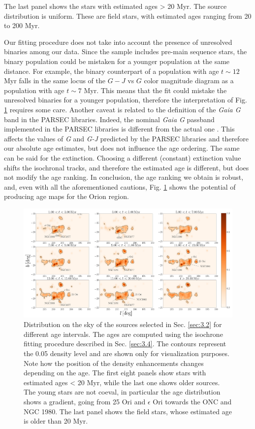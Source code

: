 \documentclass[twocolumn]{aa}
\begin{document}
\begin{itemize}
\end{itemize}
The last panel shows the stars with estimated ages > 20 Myr. The source distribution is uniform. These are field stars, with estimated ages ranging from 20 to 200 Myr. 

Our fitting procedure does not take into account the presence of unresolved binaries among our data. Since the sample includes pre-main sequence stars, the binary population could be mistaken for a younger population at the same distance. For example, the binary counterpart of a population with age $t \sim 12 $ Myr falls in the same locus of the $G-J$ vs $G$ color magnitude diagram as a population with age $t \sim 7$  Myr. This means that the fit could mistake the unresolved binaries for a younger population, therefore the interpretation of Fig. \ref{fig:9} requires some care. 
Another caveat is related to the definition of the \textit{Gaia G}  band in the PARSEC libraries. Indeed, the nominal \textit{Gaia G}  passband \citep{Jordi2010} implemented in the PARSEC libraries  is different from the actual one \citep[cfr. ][]{Carrasco2016}. This affects the values of \textit{G} and \textit{G-J} predicted by the PARSEC libraries and therefore our absolute age estimates, but does not influence the age ordering. 
The same can be said for the extinction. Choosing a different (constant) extinction value shifts the isochronal tracks, and therefore the estimated age is different, but does not modify the age ranking.
In conclusion, the age ranking we obtain is robust, and, even with all the aforementioned cautions, Fig. \ref{fig:9} shows the potential of producing age maps for the Orion region.


\begin{figure}
\includegraphics[width = \hsize]{fig11.pdf}
\caption{Distribution on the sky of the sources selected in Sec. \ref{sec:3.2} for different age intervals. The ages are computed using the isochrone fitting procedure described in Sec. \ref{sec:3.4}. The contours represent the 0.05 density level and are shown only for visualization purposes. Note how the position of the density enhancements changes depending on the age. The first eight panels show stars with estimated ages < 20 Myr, while the last one shows older sources. The young stars are not coeval, in particular the age distribution shows a gradient, going from 25 Ori and $\epsilon$ Ori towards the ONC and NGC 1980. The last panel shows the field stars, whose estimated age is older than 20 Myr.}
\label{fig:9}
\end{figure}
\end{document}
